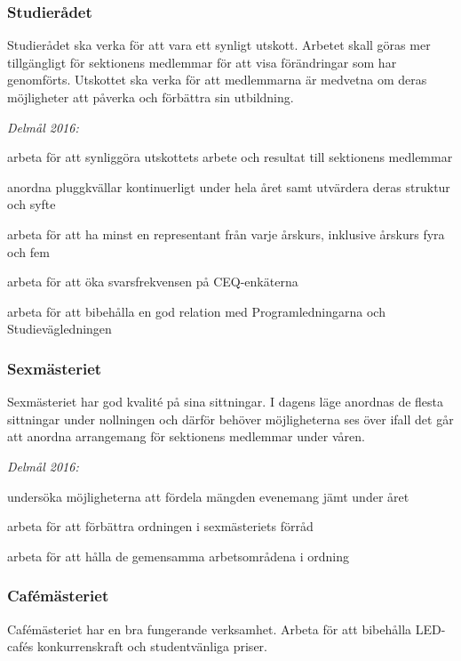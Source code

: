 \documentclass[../_main/handlingar.tex]{subfiles}
\begin{document}
\subsubsection*{Studierådet}
Studierådet ska verka för att vara ett synligt utskott. Arbetet skall göras mer tillgängligt för sektionens medlemmar för att visa förändringar som har genomförts. Utskottet ska verka för att medlemmarna är medvetna om deras möjligheter att påverka och förbättra sin utbildning.

\emph{Delmål 2016:}
\begin{dashlist}
    \item arbeta för att synliggöra utskottets arbete och resultat till sektionens medlemmar
    \item anordna pluggkvällar kontinuerligt under hela året samt utvärdera deras struktur och syfte
    \item arbeta för att ha minst en representant från varje årskurs, inklusive årskurs fyra och fem
    \item arbeta för att öka svarsfrekvensen på CEQ-enkäterna
    \item arbeta för att bibehålla en god relation med Programledningarna och Studievägledningen
\end{dashlist}

\subsubsection*{Sexmästeriet}
Sexmästeriet har god kvalité på sina sittningar. I dagens läge anordnas de flesta sittningar under nollningen och därför behöver möjligheterna ses över ifall det går att anordna arrangemang för sektionens medlemmar under våren.

\emph{Delmål 2016:}
\begin{dashlist}
    \item undersöka möjligheterna att fördela mängden evenemang jämt under året
    \item arbeta för att förbättra ordningen i sexmästeriets förråd
    \item arbeta för att hålla de gemensamma arbetsområdena i ordning
\end{dashlist}

\subsubsection*{Cafémästeriet}
Cafémästeriet har en bra fungerande verksamhet. Arbeta för att bibehålla LED-cafés konkurrenskraft och studentvänliga priser.
\end{document}

